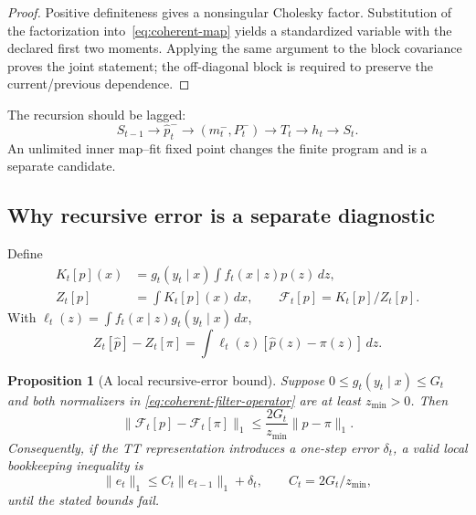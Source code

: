 \documentclass[11pt]{article}
\newtheorem{proposition}{Proposition}
\begin{document}
\begin{proof}
Positive definiteness gives a nonsingular Cholesky factor. Substitution of
the factorization into~\eqref{eq:coherent-map} yields a standardized variable
with the declared first two moments. Applying the same argument to the block
covariance proves the joint statement; the off-diagonal block is required to
preserve the current/previous dependence.
\end{proof}

The recursion should be lagged:
\[
 S_{t-1}\longrightarrow\widehat p_t^-
 \longrightarrow(m_t^-,P_t^-)
 \longrightarrow T_t\longrightarrow h_t\longrightarrow S_t.
\]
An unlimited inner map--fit fixed point changes the finite program and is a
separate candidate.

\subsection{Why recursive error is a separate diagnostic}

Define
\begin{align}
 K_t[p](x)&=g_t(y_t\mid x)\int f_t(x\mid z)p(z)\,dz,
 \label{eq:coherent-filter-k}\\
 Z_t[p]&=\int K_t[p](x)\,dx,\qquad
 \mathcal F_t[p]=K_t[p]/Z_t[p].
 \label{eq:coherent-filter-operator}
\end{align}
With $\ell_t(z)=\int f_t(x\mid z)g_t(y_t\mid x)\,dx$,
\begin{equation}\label{eq:coherent-normalizer-error}
 Z_t[\widehat p]-Z_t[\pi]=\int\ell_t(z)[\widehat p(z)-\pi(z)]\,dz.
\end{equation}

\begin{proposition}[A local recursive-error bound]
\label{prop:coherent-recursive-error}
Suppose $0\leq g_t(y_t\mid x)\leq G_t$ and both normalizers in
\eqref{eq:coherent-filter-operator} are at least $z_{\min}>0$. Then
\begin{equation}\label{eq:coherent-lipschitz}
 \|\mathcal F_t[p]-\mathcal F_t[\pi]\|_1
 \leq \frac{2G_t}{z_{\min}}\|p-\pi\|_1.
\end{equation}
Consequently, if the TT representation introduces a one-step error $\delta_t$,
a valid local bookkeeping inequality is
\begin{equation}\label{eq:coherent-error-recursion}
 \|e_t\|_1\leq C_t\|e_{t-1}\|_1+\delta_t,
 \qquad C_t=2G_t/z_{\min},
\end{equation}
until the stated bounds fail.
\end{proposition}
\end{document}
